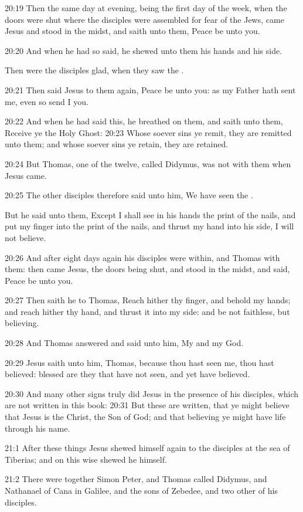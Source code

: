 20:19 Then the same day at evening, being the first day of the week, when the doors were shut where the disciples were assembled for fear of the Jews, came Jesus and stood in the midst, and saith unto them, Peace be unto you.

20:20 And when he had so said, he shewed unto them his hands and his side.

Then were the disciples glad, when they saw the \LORD.

20:21 Then said Jesus to them again, Peace be unto you: as my Father hath sent me, even so send I you.

20:22 And when he had said this, he breathed on them, and saith unto them, Receive ye the Holy Ghost: 20:23 Whose soever sins ye remit, they are remitted unto them; and whose soever sins ye retain, they are retained.

20:24 But Thomas, one of the twelve, called Didymus, was not with them when Jesus came.

20:25 The other disciples therefore said unto him, We have seen the \LORD.

But he said unto them, Except I shall see in his hands the print of the nails, and put my finger into the print of the nails, and thrust my hand into his side, I will not believe.

20:26 And after eight days again his disciples were within, and Thomas with them: then came Jesus, the doors being shut, and stood in the midst, and said, Peace be unto you.

20:27 Then saith he to Thomas, Reach hither thy finger, and behold my hands; and reach hither thy hand, and thrust it into my side: and be not faithless, but believing.

20:28 And Thomas answered and said unto him, My \LORD and my God.

20:29 Jesus saith unto him, Thomas, because thou hast seen me, thou hast believed: blessed are they that have not seen, and yet have believed.

20:30 And many other signs truly did Jesus in the presence of his disciples, which are not written in this book: 20:31 But these are written, that ye might believe that Jesus is the Christ, the Son of God; and that believing ye might have life through his name.

21:1 After these things Jesus shewed himself again to the disciples at the sea of Tiberias; and on this wise shewed he himself.

21:2 There were together Simon Peter, and Thomas called Didymus, and Nathanael of Cana in Galilee, and the sons of Zebedee, and two other of his disciples.

